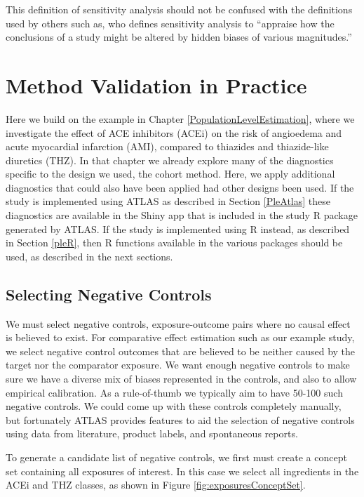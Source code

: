 \documentclass[11pt]{book}
\theoremstyle{definition}
\theoremstyle{definition}
\theoremstyle{definition}
\theoremstyle{remark}
\begin{document}
This definition of sensitivity analysis should not be confused with the
definitions used by others such as, \citet{rosenbaum_2005} who defines
sensitivity analysis to ``appraise how the conclusions of a study might
be altered by hidden biases of various magnitudes.''

\section{Method Validation in
Practice}\label{method-validation-in-practice}

Here we build on the example in Chapter \ref{PopulationLevelEstimation},
where we investigate the effect of ACE inhibitors (ACEi) on the risk of
angioedema and acute myocardial infarction (AMI), compared to thiazides
and thiazide-like diuretics (THZ). In that chapter we already explore
many of the diagnostics specific to the design we used, the cohort
method. Here, we apply additional diagnostics that could also have been
applied had other designs been used. If the study is implemented using
ATLAS as described in Section \ref{PleAtlas} these diagnostics are
available in the Shiny app that is included in the study R package
generated by ATLAS. If the study is implemented using R instead, as
described in Section \ref{pleR}, then R functions available in the
various packages should be used, as described in the next sections.

\subsection{Selecting Negative
Controls}\label{selecting-negative-controls}

We must select negative controls, exposure-outcome pairs where no causal
effect is believed to exist. For comparative effect estimation such as
our example study, we select negative control outcomes that are believed
to be neither caused by the target nor the comparator exposure. We want
enough negative controls to make sure we have a diverse mix of biases
represented in the controls, and also to allow empirical calibration. As
a rule-of-thumb we typically aim to have 50-100 such negative controls.
We could come up with these controls completely manually, but
fortunately ATLAS provides features to aid the selection of negative
controls using data from literature, product labels, and spontaneous
reports.

To generate a candidate list of negative controls, we first must create
a concept set containing all exposures of interest. In this case we
select all ingredients in the ACEi and THZ classes, as shown in Figure
\ref{fig:exposuresConceptSet}.
\end{document}
